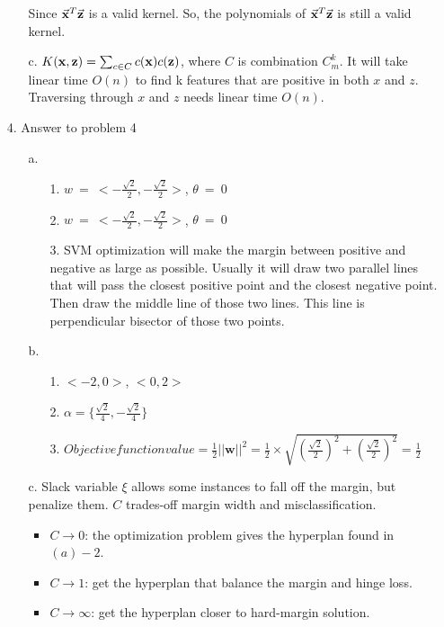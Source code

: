 \begin{enumerate}
\begin{enumerate}
\begin{equation*}
	    \end{equation*}
	    Since $\vec{{\bf x}}^T\vec{{\bf z}}$ is a valid kernel. So, the polynomials of $\vec{{\bf x}}^T\vec{{\bf z}}$ is still a valid kernel.
	\item[c.]
		$K({\bf x}, {\bf z}) = \sum_{c \in C} c({\bf x}) c({\bf z})$, where $C$ is combination $C_{m}^k$. It will take linear time $O(n)$ to find k features that are positive in both $x$ and $z$. Traversing through $x$ and $z$ needs linear time $O(n)$.
	\end{enumerate}
\item[4.] Answer to problem 4
	\begin{enumerate}
	\item[a.]
		\begin{enumerate}
		\item[1.] $w \: = \: <-\frac{\sqrt{2}}{2}, -\frac{\sqrt{2}}{2}>$, $\theta \: = \: 0$ 
		\item[2.] $w \: = \: <-\frac{\sqrt{2}}{2}, -\frac{\sqrt{2}}{2}>$, $\theta \: = \: 0$
		\item[3.] SVM optimization will make the margin between positive and negative as large as possible. Usually it will draw two parallel lines that will pass the closest positive point and the closest negative point. Then draw the middle line of those two lines. This line is perpendicular bisector of those two points.
		\end{enumerate}
	\item[b.]
		\begin{enumerate}
		\item[1.] $<-2, 0>$, $<0, 2>$
		\item[2.] $\alpha = \{\frac{\sqrt{2}}{4}, -\frac{\sqrt{2}}{4}\}$
		\item[3.] $Objective function value = \frac{1}{2}||\mathbf{w}||^2 = \frac{1}{2} \times \sqrt{(\frac{\sqrt{2}}{2})^2 + (\frac{\sqrt{2}}{2})^2} = \frac{1}{2}$
		\end{enumerate}
	\item[c.] Slack variable $\xi$ allows some instances to fall off the margin, but penalize them. $C$ trades-off margin width and misclassification. 
		\begin{itemize}
		\item $C \to 0$: the optimization problem gives the hyperplan found in $(a)-2$.
		\item $C \to 1$: get the hyperplan that balance the margin and hinge loss.
		\item $C \to \infty$: get the hyperplan closer to hard-margin solution.

\end{itemize}
\end{enumerate}
\end{enumerate}

